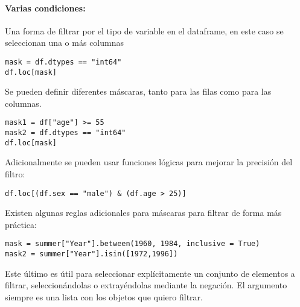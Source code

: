 \paragraph{Varias condiciones:}
Una forma de filtrar por el tipo de variable en el dataframe, en este caso se seleccionan una o más columnas
\begin{verbatim}
mask = df.dtypes == "int64"
df.loc[mask]    
\end{verbatim}
Se pueden definir diferentes máscaras, tanto para las filas como para las columnas.
\begin{verbatim}
mask1 = df["age"] >= 55
mask2 = df.dtypes == "int64"
df.loc[mask]    
\end{verbatim}
Adicionalmente se pueden usar funciones lógicas para mejorar la precisión del filtro:
\begin{verbatim}
df.loc[(df.sex == "male") & (df.age > 25)]    
\end{verbatim}
Existen algunas reglas adicionales para máscaras para filtrar de forma más práctica:
\begin{verbatim}
mask = summer["Year"].between(1960, 1984, inclusive = True)
mask2 = summer["Year"].isin([1972,1996])
\end{verbatim}
Este último es útil para seleccionar explícitamente un conjunto de elementos a filtrar, seleccionándolas o extrayéndolas mediante la negación. El argumento siempre es una lista con los objetos que quiero filtrar.
